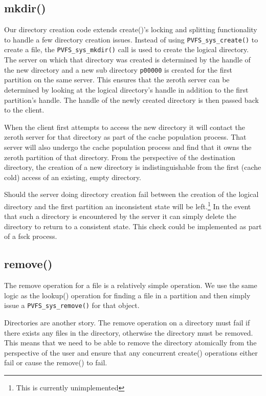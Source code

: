 \documentclass[letterpaper]{article}
\newcommand{\code}[1]{\texttt{#1}}
\begin{document}
\subsection{mkdir()}
Our directory creation code extends create()'s locking and splitting
functionality to handle a few directory creation issues.  Instead of using
\code{PVFS\_\-sys\_\-create()} to create a file, the \code{PVFS\_\-sys\_\-mkdir()} call is
used to create the logical directory.  The server on which that directory was
created is determined by the handle of the new directory and a new sub directory
\code{p00000} is created for the first partition on the same server.  This
ensures that the zeroth server can be determined by looking at the logical
directory's handle in addition to the first partition's handle.  The handle of
the newly created directory is then passed back to the client.

When the client first attempts to access the new directory it will contact the
zeroth server for that directory as part of the cache population process.  That
server will also undergo the cache population process and find that it owns the
zeroth partition of that directory.  From the perspective of the destination
directory, the creation of a new directory is indistinguishable from the first
(cache cold) access of an existing, empty directory.

Should the server doing directory creation fail between the creation of the
logical directory and the first partition an inconsistent state will be
left.\footnote{This is currently unimplemented}  In the event that such a
directory is encountered by the server it can simply delete the directory to
return to a consistent state.  This check could be implemented as part of a
fsck process.

\subsection{remove()}
The remove operation for a file is a relatively simple operation.  We use the
same logic as the lookup() operation for finding a file in a partition and then
simply issue a \code{PVFS\_\-sys\_\-remove()} for that object.

Directories are another story.  The remove operation on a directory must fail if
there exists any files in the directory, otherwise the directory must be
removed.  This means that we need to be able to remove the directory
atomically from the perspective of the user and ensure that any concurrent
create() operations either fail or cause the remove() to fail.
\end{document}

